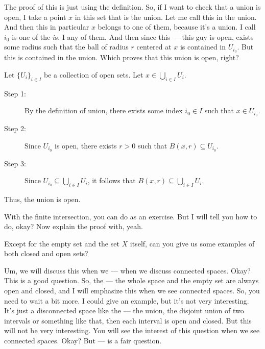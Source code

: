 \begin{spoken-clean}[continued]
The proof of this is just using the definition. So, if I want to check that a union is open, I take a point $x$ in this set that is the union. Let me call this in the union. And then this in particular $x$ belongs to one of them, because it's a union. I call $i_0$ is one of the $i$s. I any of them. And then since this --- this guy is open, exists some radius such that the ball of radius $r$ centered at $x$ is contained in $U_{i_0}$. But this is contained in the union. Which proves that this union is open, right?
\end{spoken-clean}

\begin{math-stroke}
Let $\{U_i\}_{i \in I}$ be a collection of open sets. Let $x \in \bigcup_{i \in I} U_i$.
\begin{description}
    \item[Step 1:] By the definition of union, there exists some index $i_0 \in I$ such that $x \in U_{i_0}$.
    \item[Step 2:] Since $U_{i_0}$ is open, there exists $r > 0$ such that $B(x, r) \subseteq U_{i_0}$.
    \item[Step 3:] Since $U_{i_0} \subseteq \bigcup_{i \in I} U_i$, it follows that $B(x, r) \subseteq \bigcup_{i \in I} U_i$.
\end{description}
Thus, the union is open.
\end{math-stroke}

\begin{spoken-clean}[continued]
With the finite intersection, you can do as an exercise. But I will tell you how to do, okay? Now explain the proof with, yeah. 
\end{spoken-clean}

\begin{student-interaction}
Except for the empty set and the set $X$ itself, can you give us some examples of both closed and open sets?
\end{student-interaction}

\begin{spoken-clean}[continued]
Um, we will discuss this when we --- when we discuss connected spaces. Okay? This is a good question. So, the --- the whole space and the empty set are always open and closed, and I will emphasize this when we see connected spaces. So, you need to wait a bit more. I could give an example, but it's not very interesting. It's just a disconnected space like the --- the union, the disjoint union of two intervals or something like that, then each interval is open and closed. But this will not be very interesting. You will see the interest of this question when we see connected spaces. Okay? But --- is a fair question.
\end{spoken-clean}

